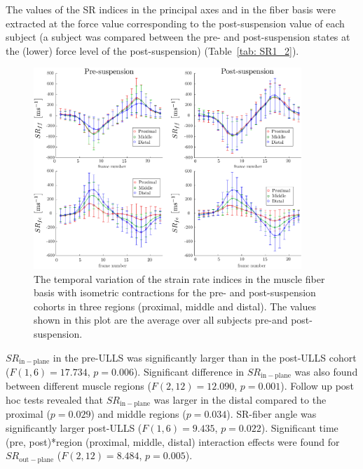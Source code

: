 The values of the SR indices in the principal axes and in the fiber basis were extracted at the force value corresponding to the post-suspension value of each subject (a subject was compared between the pre- and post-suspension states at the (lower) force level of the post-suspension) (Table~\ref{tab: SR1_2}).
\begin{figure}[!htb]
\vspace{+0.2cm}
\centering
\includegraphics[width=0.9\textwidth]{Figures/ULLS_SRff.pdf}
\caption[The temporal variation of the strain rate indices in the muscle fiber basis with isometric contractions for the pre- and post-suspension cohorts in three regions]{The temporal variation of the strain rate indices in the muscle fiber basis with isometric contractions for the pre- and post-suspension cohorts in three regions (proximal, middle and distal). The values shown in this plot are the average over all subjects pre-and post-suspension.}
\label{fig: SR1_4}
\end{figure}
$SR_{\mathrm{in-plane}}$ in the pre-ULLS was significantly larger than in the post-ULLS cohort ($F(1, 6) = 17.734$, $p = 0.006$).
Significant difference in $SR_{\mathrm{in-plane}}$ was also found between different muscle regions ($F(2,12)=12.090$, $p = 0.001$). 
Follow up post hoc tests revealed that $SR_{\mathrm{in-plane}}$ was larger in the distal compared to the proximal ($p = 0.029$) and middle regions ($p = 0.034$). 
SR-fiber angle was significantly larger post-ULLS ($F(1,6) = 9.435$, $p = 0.022$).
Significant time (pre, post)*region (proximal, middle, distal) interaction effects were found for $SR_{\mathrm{out-plane}}$ ($F(2, 12) = 8.484$, $p=0.005$). 
